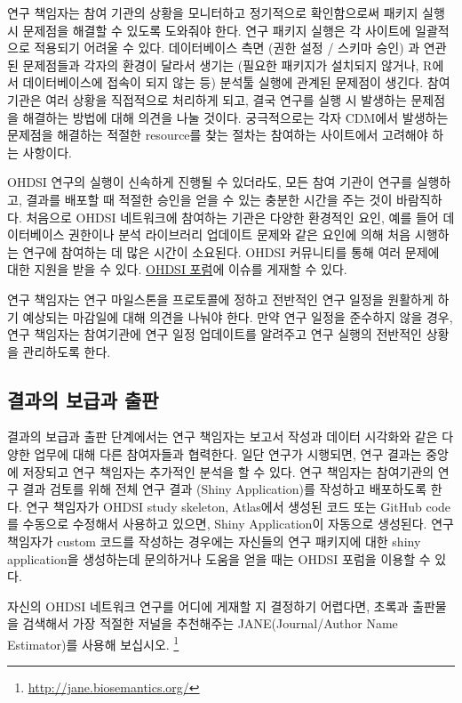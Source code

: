 \documentclass[11pt]{book}
\let\rmarkdownfootnote\footnote%
\def\footnote{\protect\rmarkdownfootnote}
\theoremstyle{definition}
\theoremstyle{definition}
\theoremstyle{definition}
\theoremstyle{remark}
\let\BeginKnitrBlock\begin \let\EndKnitrBlock\end
\begin{document}
연구 책임자는 참여 기관의 상황을 모니터하고 정기적으로 확인함으로써
패키지 실행 시 문제점을 해결할 수 있도록 도와줘야 한다. 연구 패키지
실행은 각 사이트에 일괄적으로 적용되기 어려울 수 있다. 데이터베이스 측면
(권한 설정 / 스키마 승인) 과 연관된 문제점들과 각자의 환경이 달라서
생기는 (필요한 패키지가 설치되지 않거나, R에서 데이터베이스에 접속이
되지 않는 등) 분석툴 실행에 관계된 문제점이 생긴다. 참여 기관은 여러
상황을 직접적으로 처리하게 되고, 결국 연구를 실행 시 발생하는 문제점을
해결하는 방법에 대해 의견을 나눌 것이다. 궁극적으로는 각자 CDM에서
발생하는 문제점을 해결하는 적절한 resource를 찾는 절차는 참여하는
사이트에서 고려해야 하는 사항이다.

OHDSI 연구의 실행이 신속하게 진행될 수 있더라도, 모든 참여 기관이 연구를
실행하고, 결과를 배포할 때 적절한 승인을 얻을 수 있는 충분한 시간을 주는
것이 바람직하다. 처음으로 OHDSI 네트워크에 참여하는 기관은 다양한
환경적인 요인, 예를 들어 데이터베이스 권한이나 분석 라이브러리 업데이트
문제와 같은 요인에 의해 처음 시행하는 연구에 참여하는 데 많은 시간이
소요된다. OHDSI 커뮤니티를 통해 여러 문제에 대한 지원을 받을 수 있다.
\href{http://forums.ohdsi.org}{OHDSI 포럼}에 이슈를 게재할 수 있다.

연구 책임자는 연구 마일스톤을 프로토콜에 정하고 전반적인 연구 일정을
원활하게 하기 예상되는 마감일에 대해 의견을 나눠야 한다. 만약 연구
일정을 준수하지 않을 경우, 연구 책임자는 참여기관에 연구 일정 업데이트를
알려주고 연구 실행의 전반적인 상황을 관리하도록 한다.

\subsection{결과의 보급과 출판}\label{--}

결과의 보급과 출판 단계에서는 연구 책임자는 보고서 작성과 데이터
시각화와 같은 다양한 업무에 대해 다른 참여자들과 협력한다. 일단 연구가
시행되면, 연구 결과는 중앙에 저장되고 연구 책임자는 추가적인 분석을 할
수 있다. 연구 책임자는 참여기관의 연구 결과 검토를 위해 전체 연구 결과
(Shiny Application)를 작성하고 배포하도록 한다. 연구 책임자가 OHDSI
study skeleton, Atlas에서 생성된 코드 또는 GitHub code를 수동으로
수정해서 사용하고 있으면, Shiny Application이 자동으로 생성된다. 연구
책임자가 custom 코드를 작성하는 경우에는 자신들의 연구 패키지에 대한
shiny application을 생성하는데 문의하거나 도움을 얻을 때는 OHDSI 포럼을
이용할 수 있다.

\BeginKnitrBlock{rmdimportant}
자신의 OHDSI 네트워크 연구를 어디에 게재할 지 결정하기 어렵다면, 초록과
출판물을 검색해서 가장 적절한 저널을 추천해주는 JANE(Journal/Author Name
Estimator)를 사용해 보십시오. \footnote{\url{http://jane.biosemantics.org/}}
\EndKnitrBlock{rmdimportant}
\end{document}
